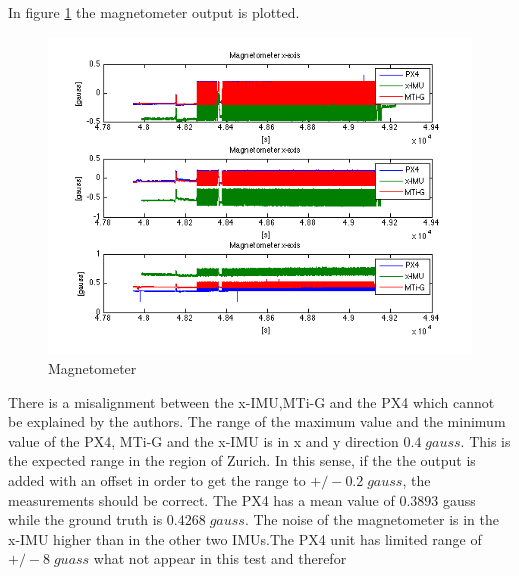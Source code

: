 In figure \ref{ct_mag} the magnetometer output is plotted.
\begin{figure}[hb]
\includegraphics[width=1\textwidth]{pictures/ct_mag.png}
\caption{Magnetometer}
\label{ct_mag}
\end{figure}
There is a misalignment between the x-IMU,MTi-G and the PX4 which cannot be explained by the authors. The range of the maximum value and the minimum value of the PX4, MTi-G and the x-IMU is in x and y direction $0.4 \;gauss$. This is the expected range in the region of Zurich. In this sense, if the the output is added with an offset in order to get the range to $+/- 0.2\; gauss$, the measurements should be correct. The PX4 has a mean value of $0.3893$ gauss while the ground truth is $0.4268 \;gauss$.  The noise of the magnetometer is in the x-IMU higher than in the other two IMUs.The PX4 unit has limited range of $+/-8\;guass$ what not appear in this test and therefor

